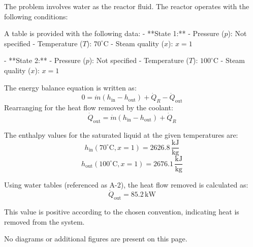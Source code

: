 The problem involves water as the reactor fluid. The reactor operates with the following conditions:  

A table is provided with the following data:  
- **State 1:**  
  - Pressure (\( p \)): Not specified  
  - Temperature (\( T \)): \( 70^\circ\text{C} \)  
  - Steam quality (\( x \)): \( x = 1 \)  

- **State 2:**  
  - Pressure (\( p \)): Not specified  
  - Temperature (\( T \)): \( 100^\circ\text{C} \)  
  - Steam quality (\( x \)): \( x = 1 \)  

The energy balance equation is written as:  
\[
0 = \dot{m} \left( h_{\text{in}} - h_{\text{out}} \right) + \dot{Q}_R - \dot{Q}_{\text{out}}
\]  
Rearranging for the heat flow removed by the coolant:  
\[
\dot{Q}_{\text{out}} = \dot{m} \left( h_{\text{in}} - h_{\text{out}} \right) + \dot{Q}_R
\]  

The enthalpy values for the saturated liquid at the given temperatures are:  
\[
h_{\text{in}}(70^\circ\text{C}, x = 1) = 2626.8 \, \frac{\text{kJ}}{\text{kg}}
\]  
\[
h_{\text{out}}(100^\circ\text{C}, x = 1) = 2676.1 \, \frac{\text{kJ}}{\text{kg}}
\]  

Using water tables (referenced as A-2), the heat flow removed is calculated as:  
\[
\dot{Q}_{\text{out}} = 85.2 \, \text{kW}
\]  

This value is positive according to the chosen convention, indicating heat is removed from the system.  

No diagrams or additional figures are present on this page.